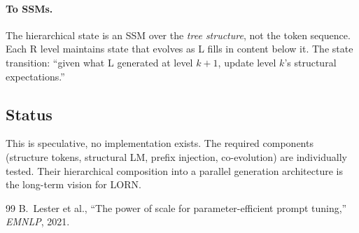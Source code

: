 \documentclass[11pt, a4paper]{article}
\theoremstyle{plain}
\theoremstyle{definition}
\theoremstyle{remark}
\begin{document}
\paragraph{To SSMs.}
The hierarchical state is an SSM over the \emph{tree structure}, not the token sequence.
Each R level maintains state that evolves as L fills in content below it.
The state transition: ``given what L generated at level $k+1$, update level $k$'s structural expectations.''

\subsection{Status}

This is speculative, no implementation exists.
The required components (structure tokens, structural LM, prefix injection, co-evolution) are individually tested.
Their hierarchical composition into a parallel generation architecture is the long-term vision for LORN.


\begin{thebibliography}{99}
B.~Lester et al., ``The power of scale for parameter-efficient prompt tuning,'' \emph{EMNLP}, 2021.
\end{thebibliography}
\end{document}

